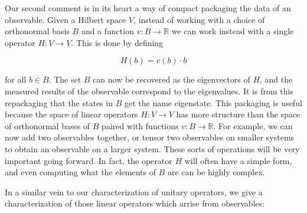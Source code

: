 \documentclass{article}
\theoremstyle{definition}
\newcommand{\RR}{\mathbb{R}}
\newcommand{\0}{\left|0\right>}
\newcommand{\1}{\left|1\right>}
\numberwithin{figure}{section}
\begin{document}
Our second comment is in its heart a way of compact packaging the data of an observable. Given a Hilbert space $V$, instead of working with a choice of orthonormal basis $B$ and a function $v:B\to \RR$ we can work instead with a single operator $H:V\to V$. This is done by defining

$$H(b)=v(b)\cdot b$$

for all $b\in B$. The set $B$ can now be recovered as the eigenvectors of $H$, and the measured results of the observable correspond to the eigenvalues. It is from this repackaging that the states in $B$ get the name eigenstate. This packaging is useful because the space of linear operators $H:V\to V$ has more structure than the space of orthonormal bases of $B$ paired with functions $v:B\to \RR$. For example, we can now add two observables together, or tensor two observables on smaller systems to obtain an observable on a larger system. These sorts of operations will be very important going forward. In fact, the operator $H$ will often have a simple form, and even computing what the elements of $B$ are can be highly complex.

In a similar vein to our characterization of unitary operators, we give a characterization of those linear operators which arrise from observables:
\end{document}
